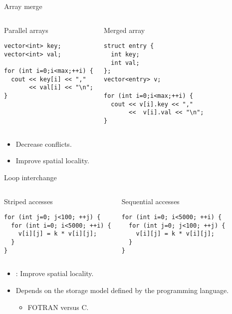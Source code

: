 \begin{frame}[t,fragile]{Array merge}
\begin{columns}[T]

\begin{block}{Parallel arrays}
\begin{lstlisting}
vector<int> key;
vector<int> val;

for (int i=0;i<max;++i) {
  cout << key[i] << "," 
       << val[i] << "\n";
}
\end{lstlisting}
\end{block}

\pause
{}
\begin{block}{Merged array}
\begin{lstlisting}
struct entry {
  int key;
  int val;
};
vector<entry> v;

for (int i=0;i<max;++i) {
  cout << v[i].key << "," 
       <<  v[i].val << "\n";
}
\end{lstlisting}
\end{block}

\end{columns}

\begin{itemize}
  \item Decrease conflicts.
  \item Improve spatial locality.
\end{itemize}
\end{frame}

\begin{frame}[t,fragile]{Loop interchange}
\begin{columns}[T]

\begin{block}{Striped accesses}
\begin{lstlisting}
for (int j=0; j<100; ++j) {
  for (int i=0; i<5000; ++i) {
    v[i][j] = k * v[i][j];
  }
}
\end{lstlisting}
\end{block}

\pause
{}
\begin{block}{Sequential accesses}
\begin{lstlisting}
for (int i=0; i<5000; ++i) {
  for (int j=0; j<100; ++j) {
    v[i][j] = k * v[i][j];
  }
}
\end{lstlisting}
\end{block}
\end{columns}

\begin{itemize}
  \item {}: Improve spatial locality.
  \item Depends on the storage model defined by the programming language.
    \begin{itemize}
      \item FOTRAN versus C.
    \end{itemize}
\end{itemize}
\end{frame}

